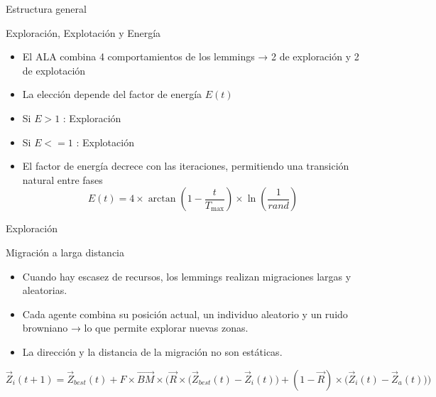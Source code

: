 \documentclass[12pt]{beamer}
\begin{document}
\begin{frame}{Estructura general }
  \begin{block}{Exploración, Explotación y Energía}
      \justifying
      \begin{itemize}
          \item El ALA combina 4 comportamientos de los lemmings → 2 de exploración y 2 de explotación
          \item La elección depende del factor de energía $E(t)$
          \item Si $E > 1$ : Exploración
          \item Si $E <= 1$ : Explotación
          \item El factor de energía decrece con las iteraciones, permitiendo una transición natural entre fases
          \begin{equation*}
              E(t) = 4 \times \arctan\!\left( 1 - \frac{t}{T_{\text{max}}} \right) 
       \times \ln\!\left( \frac{1}{rand} \right) \tag{17}
          \end{equation*}
      \end{itemize}
  \end{block}
\end{frame}

\begin{frame}{Exploración }
  \begin{block}{Migración a larga distancia}
      \justifying
      \begin{itemize}
          \item Cuando hay escasez de recursos, los lemmings realizan migraciones largas y aleatorias.
          \item Cada agente combina su posición actual, un individuo aleatorio y un ruido browniano → lo que permite explorar nuevas zonas.
          \item La dirección y la distancia de la migración no son estáticas. 
      \end{itemize} 
  \end{block}
  \small
  \begin{equation*}
\vec{Z}_{i}(t+1) = \vec{Z}_{best}(t) 
+ F \times \overrightarrow{BM} \times 
\Big( \vec{R} \times \big( \vec{Z}_{best}(t) - \vec{Z}_{i}(t) \big) 
+ (1 - \vec{R}) \times \big( \vec{Z}_{i}(t) - \vec{Z}_{a}(t) \big) \Big)  \tag{5}
\end{equation*}
\end{frame}
\end{document}
